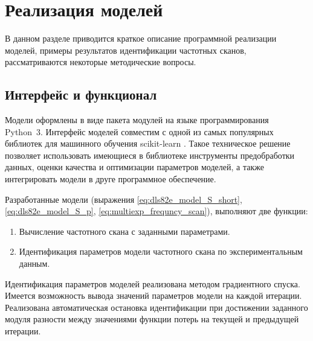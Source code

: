 \section{Реализация моделей}
	В данном разделе приводится краткое описание программной реализации
	моделей, примеры результатов идентификации частотных сканов, рассматриваются 
	некоторые методические вопросы.


	\subsection{Интерфейс и функционал}
	Модели оформлены в виде пакета модулей на языке программирования Python~3.
	Интерфейс моделей совместим с одной из самых популярных библиотек для 
	машинного обучения scikit-learn \cite{sklearn_website}. Такое техническое
	решение позволяет использовать имеющиеся в библиотеке инструменты 
	предобработки данных, оценки качества и оптимизации параметров 
	моделей, а также интегрировать модели в друге программное обеспечение.

	Разработанные модели (выражения	\ref{eq:dls82e_model_S_short}, 
	\ref{eq:dls82e_model_S_p}, \ref{eq:multiexp_frequncy_scan}), выполняют две 
	функции:
	\begin{enumerate}
		\item Вычисление частотного скана с заданными параметрами.
		\item Идентификация параметров модели частотного скана по 
		экспериментальным данным.
	\end{enumerate}
	Идентификация параметров моделей реализована методом градиентного спуска.
	Имеется возможность вывода значений параметров модели на каждой итерации.
	Реализована автоматическая остановка идентификации при достижении заданного
	модуля разности между значениями функции потерь на текущей и предыдущей 
	итерации.

